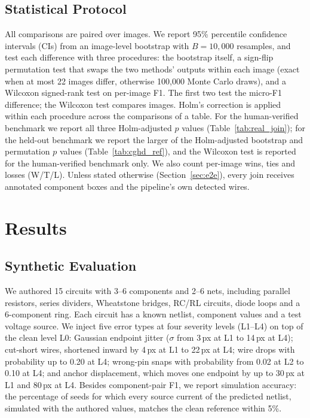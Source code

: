 \documentclass[journal]{IEEEtran}
\begin{document}
\subsection{Statistical Protocol}

All comparisons are paired over images. We report 95\% percentile confidence intervals (CIs) from an image-level bootstrap with $B=10{,}000$ resamples, and test each difference with three procedures: the bootstrap itself, a sign-flip permutation test that swaps the two methods' outputs within each image (exact when at most 22 images differ, otherwise 100{,}000 Monte Carlo draws), and a Wilcoxon signed-rank test on per-image F1. The first two test the micro-F1 difference; the Wilcoxon test compares images. Holm's correction is applied within each procedure across the comparisons of a table. For the human-verified benchmark we report all three Holm-adjusted $p$ values (Table~\ref{tab:real_join}); for the held-out benchmark we report the larger of the Holm-adjusted bootstrap and permutation $p$ values (Table~\ref{tab:cghd_ref}), and the Wilcoxon test is reported for the human-verified benchmark only. We also count per-image wins, ties and losses (W/T/L). Unless stated otherwise (Section~\ref{sec:e2e}), every join receives annotated component boxes and the pipeline's own detected wires.

\section{Results}
\label{sec:results}

\subsection{Synthetic Evaluation}
\label{sec:synthetic}

We authored 15 circuits with 3--6 components and 2--6 nets, including parallel resistors, series dividers, Wheatstone bridges, RC/RL circuits, diode loops and a 6-component ring. Each circuit has a known netlist, component values and a test voltage source. We inject five error types at four severity levels (L1--L4) on top of the clean level L0: Gaussian endpoint jitter ($\sigma$ from 3\,px at L1 to 14\,px at L4); cut-short wires, shortened inward by 4\,px at L1 to 22\,px at L4; wire drops with probability up to 0.20 at L4; wrong-pin snaps with probability from 0.02 at L2 to 0.10 at L4; and anchor displacement, which moves one endpoint by up to 30\,px at L1 and 80\,px at L4. Besides component-pair F1, we report simulation accuracy: the percentage of seeds for which every source current of the predicted netlist, simulated with the authored values, matches the clean reference within 5\%.
\end{document}
